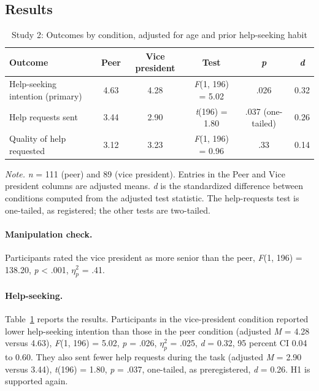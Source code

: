 \documentclass[11pt]{article}
\newcommand{\etap}{\ensuremath{\eta^2_p}}
\begin{document}
\subsection{Results}

\begin{table}[ht]
\centering
\caption{Study 2: Outcomes by condition, adjusted for age and prior help-seeking habit}
\label{tab:s2}
\small
\begin{tabular}{lccccc}
\toprule
Outcome & Peer & Vice president & Test & \textit{p} & \textit{d} \\
\midrule
Help-seeking intention (primary) & 4.63 & 4.28 & {\itshape F}(1, 196) = 5.02 & .026 & 0.32 \\
Help requests sent & 3.44 & 2.90 & \textit{t}(196) = 1.80 & .037 (one-tailed) & 0.26 \\
Quality of help requested & 3.12 & 3.23 & {\itshape F}(1, 196) = 0.96 & .33 & 0.14 \\
\bottomrule
\end{tabular}

\smallskip
\parbox{0.9\linewidth}{\footnotesize\textit{Note.} \textit{n} = 111 (peer) and 89 (vice president). Entries in the Peer and Vice president columns are adjusted means. \textit{d} is the standardized difference between conditions computed from the adjusted test statistic. The help-requests test is one-tailed, as registered; the other tests are two-tailed.}
\end{table}

\paragraph{Manipulation check.} Participants rated the vice president as more senior than the peer, {\itshape F}(1, 196) = 138.20, \textit{p} < .001, \etap{} = .41.

\paragraph{Help-seeking.} Table~\ref{tab:s2} reports the results. Participants in the vice-president condition reported lower help-seeking intention than those in the peer condition (adjusted \textit{M} = 4.28 versus 4.63), {\itshape F}(1, 196) = 5.02, \textit{p} = .026, \etap{} = .025, \textit{d} = 0.32, 95 percent CI 0.04 to 0.60. They also sent fewer help requests during the task (adjusted \textit{M} = 2.90 versus 3.44), \textit{t}(196) = 1.80, \textit{p} = .037, one-tailed, as preregistered, \textit{d} = 0.26. H1 is supported again.
\end{document}
